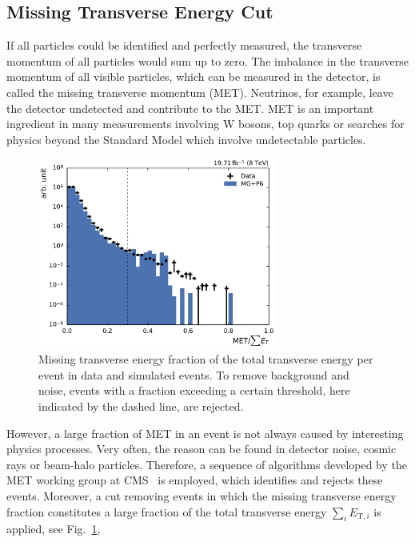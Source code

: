 \subsection{Missing Transverse Energy Cut}

If all particles could be identified and perfectly measured, the transverse
momentum of all particles would sum up to zero. The imbalance in the transverse
momentum of all visible particles, which can be measured in the detector, is
called the missing transverse momentum (MET). Neutrinos, for example, leave the
detector undetected and contribute to the MET. MET is an important ingredient
in many measurements involving W bosons, top quarks or searches for physics
beyond the Standard Model which involve undetectable particles. 

\begin{figure}[htbp]
    \centering
    \includegraphics[width=0.7\textwidth]{figures/measurement/metoversumet.pdf}
    \caption[Missing transverse energy distribution]{Missing transverse energy
    fraction of the total transverse energy per event in data and simulated
    events. To remove background and noise, events with a fraction exceeding a
    certain threshold, here indicated by the dashed line, are rejected.}
    \label{fig:mc:met_fraction}
\end{figure}

However, a large fraction of MET in an event is not always caused by interesting
physics processes. Very often, the reason can be found in detector noise, cosmic
rays or beam-halo particles. Therefore, a sequence of algorithms developed by
the MET working group at CMS~\cite{jetmet:metfilters} is employed, which
identifies and rejects these events. Moreover, a cut removing events in which
the missing transverse energy fraction \met constitutes a large fraction of the
total transverse energy $\sum_i E_{\mathrm{T},i}$ is applied, see
Fig.~\ref{fig:mc:met_fraction},

